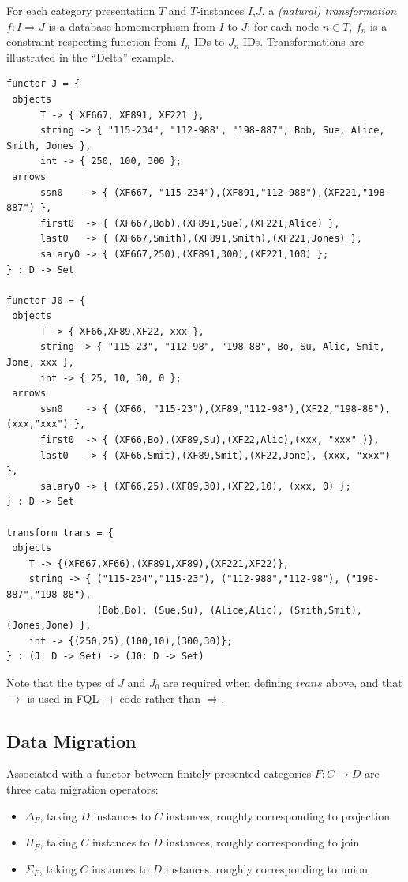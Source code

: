 \documentclass[12pt]{article}
\begin{document}
For each category presentation $T$ and $T$-instances $I$,$J$, a {\it (natural) transformation} $f : I \Rightarrow J$ is a database homomorphism from $I$ to $J$: for each node $n \in T$, $f_n$ is a constraint respecting function from $I_n$ IDs to $J_n$ IDs.  Transformations are illustrated in the ``Delta'' example.  
\begin{verbatim}
functor J = {
 objects 
	  T -> { XF667, XF891, XF221 },
	  string -> { "115-234", "112-988", "198-887", Bob, Sue, Alice, Smith, Jones },
	  int -> { 250, 100, 300 };
 arrows
	  ssn0    -> { (XF667, "115-234"),(XF891,"112-988"),(XF221,"198-887") },
	  first0  -> { (XF667,Bob),(XF891,Sue),(XF221,Alice) },
	  last0   -> { (XF667,Smith),(XF891,Smith),(XF221,Jones) },
	  salary0 -> { (XF667,250),(XF891,300),(XF221,100) };
} : D -> Set

functor J0 = {
 objects 
	  T -> { XF66,XF89,XF22, xxx },
	  string -> { "115-23", "112-98", "198-88", Bo, Su, Alic, Smit, Jone, xxx },
	  int -> { 25, 10, 30, 0 };
 arrows
	  ssn0    -> { (XF66, "115-23"),(XF89,"112-98"),(XF22,"198-88"), (xxx,"xxx") },
	  first0  -> { (XF66,Bo),(XF89,Su),(XF22,Alic),(xxx, "xxx" )},
	  last0   -> { (XF66,Smit),(XF89,Smit),(XF22,Jone), (xxx, "xxx") },
	  salary0 -> { (XF66,25),(XF89,30),(XF22,10), (xxx, 0) };
} : D -> Set

transform trans = {
 objects 
 	T -> {(XF667,XF66),(XF891,XF89),(XF221,XF22)},
 	string -> { ("115-234","115-23"), ("112-988","112-98"), ("198-887","198-88"), 
 	            (Bob,Bo), (Sue,Su), (Alice,Alic), (Smith,Smit), (Jones,Jone) },
 	int -> {(250,25),(100,10),(300,30)};
} : (J: D -> Set) -> (J0: D -> Set)  
\end{verbatim}
Note that the types of $J$ and $J_0$ are required when defining $trans$ above, and that $\to$ is used in FQL++ code rather than $\Rightarrow$.

\newpage
\subsection{Data Migration}

Associated with a functor between finitely presented categories $F : C \to D$ are three data migration operators:
\begin{itemize}
\item $\Delta_F$, taking $D$ instances to $C$ instances, roughly corresponding to projection
\item $\Pi_F$, taking $C$ instances to $D$ instances, roughly corresponding to join
\item $\Sigma_F$, taking $C$ instances to $D$ instances, roughly corresponding to union
\end{itemize}
\end{document}
